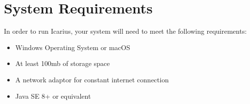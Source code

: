 \section{System Requirements}
In order to run Icarius, your system will need to meet the following requirements:
\begin{itemize}
    \item Windows Operating System or macOS
    \item At least 100mb of storage space
    \item A network adaptor for constant internet connection
    \item Java SE 8+ or equivalent
\end{itemize}